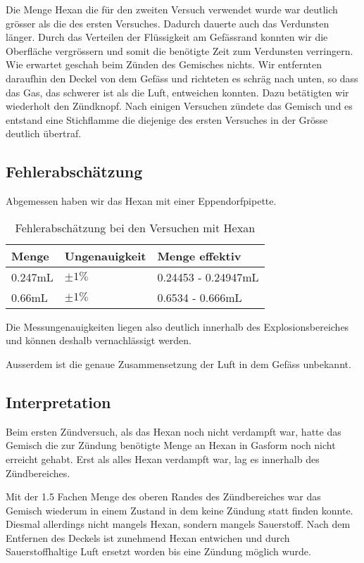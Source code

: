 \documentclass[11pt,paper=a4,final]{scrartcl}
\begin{document}
Die Menge Hexan die f\"ur den zweiten Versuch verwendet wurde war deutlich
gr\"osser als die des ersten Versuches. Dadurch dauerte auch das Verdunsten
l\"anger. Durch das Verteilen der Fl\"ussigkeit am Gef\"assrand konnten wir die
Oberfl\"ache vergr\"ossern und somit die ben\"otigte Zeit zum Verdunsten
verringern. Wie erwartet geschah beim Z\"unden des Gemisches nichts. Wir
entfernten daraufhin den Deckel von dem Gef\"ass und richteten es schr\"ag nach
unten, so dass das Gas, das schwerer ist als die Luft, entweichen konnten. Dazu
bet\"atigten wir wiederholt den Z\"undknopf. Nach einigen Versuchen z\"undete
das Gemisch und es entstand eine Stichflamme die diejenige des ersten Versuches
in der Gr\"osse deutlich \"ubertraf.
\subsection{Fehlerabsch\"atzung}
Abgemessen haben wir das Hexan mit einer Eppendorfpipette.
\begin{table}[h!]
  \centering
  \begin{tabular}{|l|l|l|}\hline
    \bf Menge	& \bf Ungenauigkeit	& \bf Menge effektiv	\\
    \hline
    0.247mL	& \(\pm 1\%\)	&	0.24453 - 0.24947mL	\\
    \hline
    0.66mL	& \(\pm 1\%\)	&	0.6534 - 0.666mL	\\
    \hline
  \end{tabular}
  \caption{Fehlerabsch\"atzung bei den Versuchen mit Hexan}
  \label{tab:}
\end{table}
Die Messungenauigkeiten liegen also deutlich innerhalb des Explosionsbereiches
und k\"onnen deshalb vernachl\"assigt werden.

Ausserdem ist die genaue Zusammensetzung der Luft in dem Gef\"ass unbekannt.
\subsection{Interpretation}
Beim ersten Z\"undversuch, als das Hexan noch nicht verdampft war, hatte das
Gemisch die zur Z\"undung ben\"otigte Menge an Hexan in Gasform noch nicht
erreicht gehabt. Erst als alles Hexan verdampft war, lag es innerhalb des
Z\"undbereiches.

Mit der 1.5 Fachen Menge des oberen Randes des Z\"undbereiches war das Gemisch
wiederum in einem Zustand in dem keine Z\"undung statt finden konnte. Diesmal
allerdings nicht mangels Hexan, sondern mangels Sauerstoff. Nach dem Entfernen
des Deckels ist zunehmend Hexan entwichen und durch Sauerstoffhaltige Luft
ersetzt worden bis eine Z\"undung m\"oglich wurde.
\end{document}
